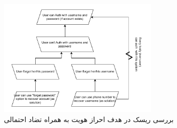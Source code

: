 \begin{figure}[H]
    \centering
    \includegraphics[width=0.7\textwidth]{assets/auth_conflict_risk_diagram.drawio.pdf}
    \caption{بررسی ریسک در هدف احراز هویت به همراه تضاد احتمالی}
\end{figure}
